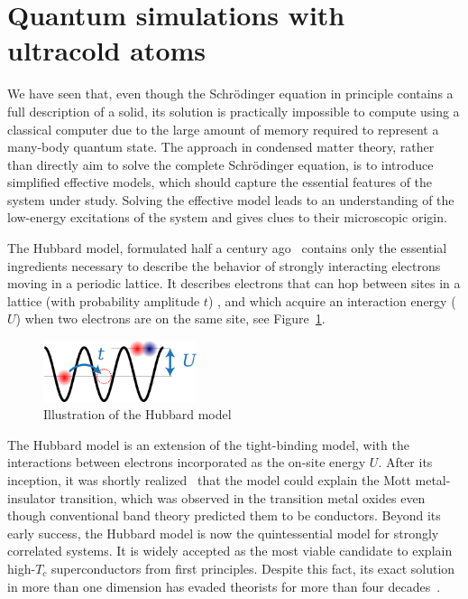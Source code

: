 \section{Quantum simulations with ultracold atoms}

We have seen that, even though the Schr\"{o}dinger equation in principle
contains a full description of a solid,  its solution is practically impossible
to compute using a classical computer due to the large amount of memory
required to represent a many-body quantum state.   
The approach in condensed matter theory, rather than directly aim to solve the
complete Schr\"{o}dinger equation, is to introduce simplified effective models,
which should capture the essential features of the system under study.  Solving
the effective model leads to an understanding of the low-energy excitations of
the system and gives clues to their microscopic origin.   

The Hubbard model, formulated half a century ago~\cite{hubbard50} contains only
the essential ingredients necessary to describe the  behavior of strongly
interacting electrons moving in a periodic lattice. It describes electrons that
can hop between sites in a lattice (with probability amplitude $t$) , and which
acquire an interaction energy ($U$) when two electrons are on the same site,
see Figure~\ref{fig:chap01hubbard}.  
\begin{figure} \centering
\includegraphics[width=0.4\textwidth]{../figures/hubbard/little-hubbard.png}
\caption[Hubbard model]{\small Illustration of the Hubbard model }
\label{fig:chap01hubbard}
\end{figure}
The Hubbard model is an extension of the tight-binding model, with the
interactions between electrons incorporated as the on-site energy $U$.
After its inception, it was shortly realized~\cite{Hubbard1964} that the model
could explain the Mott metal-insulator transition, which was observed in the
transition metal oxides even though conventional band theory predicted them to
be conductors.  Beyond its early success, the Hubbard model is now the
quintessential model for strongly correlated systems.  It is widely accepted as
the most viable candidate to explain high-$T_{c}$ superconductors from first
principles.   Despite this fact, its exact solution in more than one dimension
has evaded theorists for more than four decades~\cite{quintanilla2009strong}.

